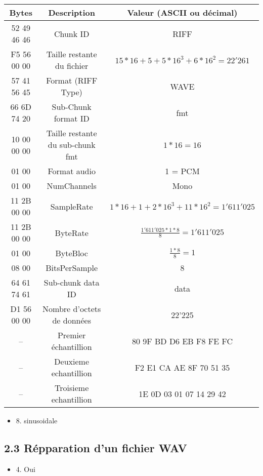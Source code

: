\documentclass[a4paper, 12pt]{article}
\begin{document}
\begin{tabular}{|c|c|c|}
  \hline
    Bytes & Description & Valeur (ASCII ou décimal) \\
  \hline
    52 49 46 46 & Chunk ID & RIFF \\
    F5 56 00 00 & Taille restante du fichier & $15 * 16 + 5 + 5 * 16^{3} + 6 * 16^{2} = 22'261$\\
    57 41 56 45 & Format (RIFF Type) & WAVE \\
    66 6D 74 20 & Sub-Chunk format ID & fmt \\
    10 00 00 00 & Taille restante du sub-chunk fmt & $1 * 16 = 16$ \\
    01 00 & Format audio & 1 = PCM \\
    01 00 & NumChannels & Mono \\
    11 2B 00 00 & SampleRate & $1 * 16 + 1 + 2 * 16^{3} + 11 * 16^{2} = 1'611'025$ \\
    11 2B 00 00 & ByteRate & $ \frac{1'611'025 * 1 *  8}{8} = 1'611'025$\\
    01 00 & ByteBloc & $\frac{1 * 8}{8} = 1$\\
    08 00 & BitsPerSample & 8 \\
    64 61 74 61 & Sub-chunk data ID & data \\
    D1 56 00 00 & Nombre d'octets de données & 22'225 \\
    -- & Premier échantillion & 80 9F BD D6 EB F8 FE FC \\
    -- & Deuxieme echantillion & F2 E1 CA AE 8F 70 51 35 \\
    -- & Troisieme echantillion & 1E 0D 03 01 07 14 29 42 \\
  \hline
\end{tabular}
\begin{itemize}
    \item 8. sinusoidale

\end{itemize}

\subsection*{2.3 Répparation d'un fichier WAV}
\begin{itemize}
    \item 4. Oui

\end{itemize}
\end{document}
